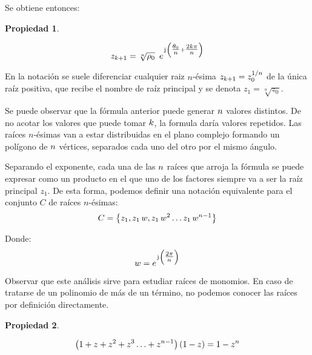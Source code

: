 \documentclass[a5paper,12pt,twoside]{book}
\newtheorem{prop}{{Propiedad}}[chapter]
\begin{document}
Se obtiene entonces:

\begin{mdframed}[style=PropertyFrame]
    \begin{prop}
    \end{prop}
    \begin{equation*}
        z_{k+1} = \sqrt[n]{\rho_0} \enspace e^{\mkern2mu\mathrm{j}\mkern1mu \left( \tfrac{\theta_0}{n} + \tfrac{2 k \pi}{n} \right)}
    \end{equation*}
\end{mdframed}

En la notación se suele diferenciar cualquier raiz $n$-ésima $z_{k+1} = z_0^{1/n}$ de la única raíz positiva, que recibe el nombre de raíz principal y se denota $z_1=\sqrt[n]{z_0}$.

Se puede observar que la fórmula anterior puede generar $n$ valores distintos.
De no acotar los valores que puede tomar $k$, la formula daría valores repetidos.
Las raíces $n$-ésimas van a estar distribuidas en el plano complejo formando un polígono de $n$ vértices, separados cada uno del otro por el mismo ángulo.

Separando el exponente, cada una de las $n$ raíces que arroja la fórmula se puede expresar como un producto en el que uno de los factores siempre va a ser la raíz principal $z_1$.
De esta forma, podemos definir una notación equivalente para el conjunto $C$ de raíces $n$-ésimas:
\begin{equation*}
    C = { \left\{ {z_1 , z_1 \, w , z_1 \, w^2 \ldots z_1 \, w^{n-1}} \right\} }
\end{equation*}

Donde:
\begin{equation*}
    w = e^{\mkern2mu\mathrm{j}\mkern1mu \left( \tfrac{2 \pi}{n} \right)}
\end{equation*}

Observar que este análisis sirve para estudiar raíces de monomios.
En caso de tratarse de un polinomio de más de un término, no podemos conocer las raíces por definición directamente.

\begin{mdframed}[style=PropertyFrame]
    \begin{prop}
    \end{prop}
    \begin{equation*}
        \left( 1 + z + z^2 + z^3 \ldots + z^{n-1} \right) \left( 1 - z \right) = 1 - z^n
    \end{equation*}
\end{mdframed}
\end{document}
